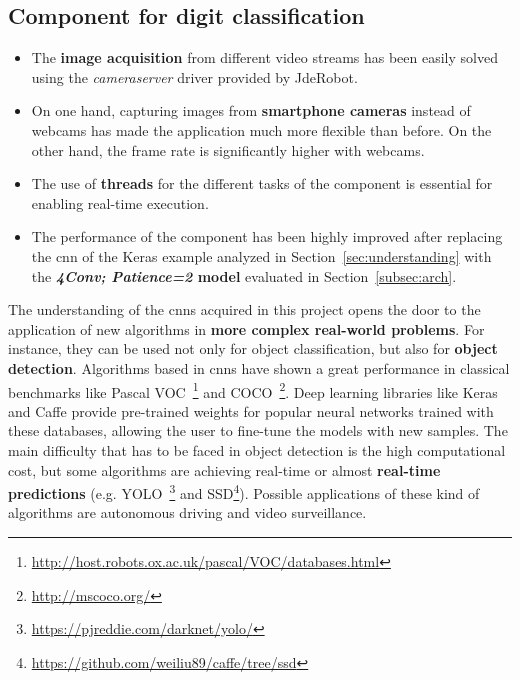 \subsection*{Component for digit classification}
\begin{itemize}
	\item The \textbf{image acquisition} from different video streams has been easily solved using the \textit{cameraserver} driver provided by JdeRobot.
	\item On one hand, capturing images from \textbf{smartphone cameras} instead of webcams has made the application much more flexible than before. On the other hand, the frame rate is significantly higher with webcams.
	\item The use of \textbf{threads} for the different tasks of the component is essential for enabling real-time execution.
	\item The performance of the component has been highly improved after replacing the \gls{cnn} of the Keras example analyzed in Section~\ref{sec:understanding} with the \textbf{\textit{4Conv; Patience=2} model} evaluated in Section~\ref{subsec:arch}.
\end{itemize}

The understanding of the \glspl{cnn} acquired in this project opens the door to the application of new algorithms in \textbf{more complex real-world problems}. For instance, they can be used not only for object classification, but also for \textbf{object detection}. Algorithms based in \glspl{cnn} have shown a great performance in classical benchmarks like Pascal VOC~\footnote{\url{http://host.robots.ox.ac.uk/pascal/VOC/databases.html}} and COCO~\footnote{\url{http://mscoco.org/}}. Deep learning libraries like Keras and Caffe provide pre-trained weights for popular neural networks trained with these databases, allowing the user to fine-tune the models with new samples. The main difficulty that has to be faced in object detection is the high computational cost, but some algorithms are achieving real-time or almost \textbf{real-time predictions} (e.g. YOLO~\footnote{\url{https://pjreddie.com/darknet/yolo/}} and SSD\footnote{\url{https://github.com/weiliu89/caffe/tree/ssd}}). Possible applications of these kind of algorithms are autonomous driving and video surveillance.